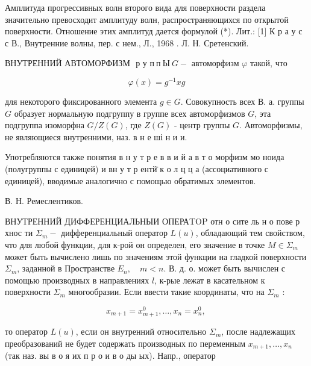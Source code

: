 \documentclass[10pt]{article}
\begin{document}
Амплитуда прогрессивных волн второго вида для поверхности раздела значительно превосходит амплитуду волн, распространяющихся по открытой поверхности. Отношение этих амплитуд дается формулой (*). Лит.: [1] К р а у с с В., Внутренние волны, пер. с нем., Л., 1968 . Л. Н. Сретенский.



ВНУТРЕННИЙ АВТОМОРФИЗМ $\boldsymbol{\text { р у } п ~ п ~ Ы ~} G-$ автоморфизм $\varphi$ такой, что



\[

\varphi(x)=g^{-1} x g

\]



для некоторого фиксированного элемента $g \in G$. Совокупность всех В. а. группы $G$ образует нормальную подгруппу в группе всех автоморфизмов $G$, эта подгруппа изоморфна $G / Z(G)$, где $Z(G)$ - центр группы $G$. Автоморфизмы, не являющиеся внутренними, наз. в н е ші н и и.



Употребляются также понятия в н у т р е в в и й а в т о морфизм мо ноида (полугруппы с единицей) и вн у т р ентй̈ к о л ц ц а (ассоциативного с единицей), вводимые аналогично с помощью обратимых элементов.



В. Н. Ремеслентиков.



ВНУТРЕННИЙ ДИФФЕРЕНЦИАЛЬНЫИ ОПЕРАTOP отн о сите ль н о пове р хнос ти $\Sigma_{m}-$ дифференциальный оператор $L(u)$, обладающий тем свойством, что для любой функции, для к-рой он определен, его значение в точке $M \in \Sigma_{m}$ может быть вычислено лишь по значениям этой функции на гладкой поверхности $\Sigma_{m}$, заданной в Пространстве $E_{n}, \quad m<n$. В. д. о. может быть вычислен с помощью производных в направлениях $l$, к-рые лежат в касательном к поверхности $\Sigma_{m}$ многообразии. Если ввести такие координаты, что на $\Sigma_{m}$ :



\[

x_{m+1}=x_{m+1}^{0}, \ldots, x_{n}=x_{n}^{0} \text {, }

\]



то оператор $L(u)$, если он внутренний относительно $\Sigma_{m}$, после надлежащих преобразований не будет содержать производных по переменным $x_{m+1}, \ldots, x_{n}$ (так наз. вы в о я их п р о и в о ды ых). Напр., оператор
\end{document}
